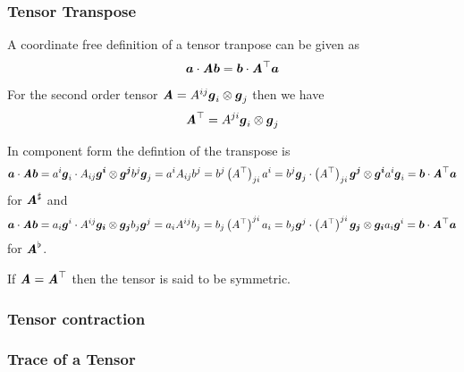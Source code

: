 \subsubsection{Tensor Transpose}
\label{subsubsec:TensorTransposeSecondOrder}

A coordinate free definition of a tensor tranpose can be given as
\begin{equation}
    \boldsymbol{a}   \cdot  \boldsymbol{\mathit{A}} \boldsymbol{b}  =  \boldsymbol{b}   \cdot   {\ensuremath{\boldsymbol{\mathit{A}}}}^{ \top }  \boldsymbol{a}  
\end{equation}

For the second order tensor
$\boldsymbol{\mathit{A}}=A^{ij}  \boldsymbol{g} _{i} \otimes  \boldsymbol{g} _{j} $ then we
have
\begin{equation}
   {\ensuremath{\boldsymbol{\mathit{A}}}}^{ \top } =A^{ji}  \boldsymbol{g} _{i} \otimes  \boldsymbol{g} _{j} 
\end{equation}

In component form the defintion of the transpose is
\begin{equation}
    \boldsymbol{a}   \cdot  \boldsymbol{\mathit{A}} \boldsymbol{b}  = a^{i} \boldsymbol{g} _{i}  \cdot  A_{ij}  \boldsymbol{g^{i}}  \otimes  \boldsymbol{g^{j}}   b^{j} \boldsymbol{g} _{j}=a^{i}A_{ij}b^{j}=b^{j}\left(  {A}^{ \top }  \right)_{ji}a^{i}= b^{j} \boldsymbol{g} _{j}  \cdot  \left(  {A}^{ \top }  \right)_{ji}  \boldsymbol{g^{j}}  \otimes  \boldsymbol{g^{i}}   a^{i} \boldsymbol{g} _{i}=  \boldsymbol{b}   \cdot   {\ensuremath{\boldsymbol{\mathit{A}}}}^{ \top }  \boldsymbol{a}  
\end{equation}
for $ \boldsymbol{\mathit{A}}^{\sharp} $ and
\begin{equation}
    \boldsymbol{a}   \cdot  \boldsymbol{\mathit{A}} \boldsymbol{b}  = a_{i} \boldsymbol{g} ^{i}  \cdot  A^{ij}  \boldsymbol{g_{i}}  \otimes  \boldsymbol{g_{j}}   b_{j} \boldsymbol{g} ^{j}=a_{i}A^{ij}b_{j}=b_{j}\left(  {A}^{ \top }  \right)^{ji}a_{i}= b_{j} \boldsymbol{g} ^{j}  \cdot  \left(  {A}^{ \top }  \right)^{ji}  \boldsymbol{g_{j}}  \otimes  \boldsymbol{g_{i}}   a_{i} \boldsymbol{g} ^{i}=  \boldsymbol{b}   \cdot   {\ensuremath{\boldsymbol{\mathit{A}}}}^{ \top }  \boldsymbol{a}  
\end{equation}
for $\boldsymbol{\mathit{A}}^{\flat}$.

If $\boldsymbol{\mathit{A}}= {\boldsymbol{\mathit{A}}}^{ \top } $ then the tensor is said to be
symmetric. 

\subsubsection{Tensor contraction}
\label{subsubsec:TensorContractionSecondOrder}

\subsubsection{Trace of a Tensor}
\label{subsubsec:TraceTensorSecondOrder}


